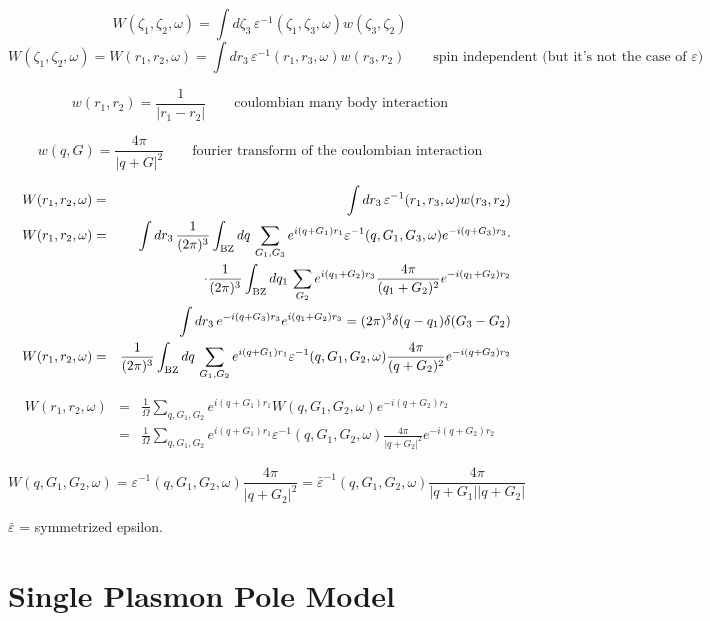 \documentclass[fleqn]{article}
\begin{document}
\[
W(\zeta_1,\zeta_2,\omega) = \int d\zeta_3 \, \varepsilon^{-1}(\zeta_1,\zeta_3,\omega) w(\zeta_3,\zeta_2)
\]
\[
W(\zeta_1,\zeta_2,\omega) =
W(r_1,r_2,\omega) = \int dr_3 \, \varepsilon^{-1}(r_1,r_3,\omega) w(r_3,r_2)
\qquad \textrm{spin independent (but it's not the case of $\varepsilon$)}
\]

\[
  w(r_1,r_2) = \frac{1}{|r_1-r_2|}
  \qquad \textrm{coulombian many body interaction}
\]

\[
  w(q,G) = \frac{4 \pi}{|q+G|^2}
  \qquad \textrm{fourier transform of the coulombian interaction}
\]

\begin{eqnarray*}
\quad
W(r_1,r_2,\omega) &=& \int dr_3 \, \varepsilon^{-1}(r_1,r_3,\omega) w(r_3,r_2) \\
W(r_1,r_2,\omega) 
  &=& \int dr_3 \, \frac{1}{(2\pi)^3} \int_{\rm BZ} dq \, \sum_{G_1,G_3} e^{i (q+G_1) r_1}
  \varepsilon^{-1}(q,G_1,G_3,\omega) e^{-i (q+G_3) r_3} \cdot \\ && \cdot
  \frac{1}{(2\pi)^3} \int_{\rm BZ} dq_1\, \sum_{G_2} e^{i (q_1+G_2) r_3}
  \frac{4\pi}{(q_1+G_2)^2} e^{-i (q_1+G_2) r_2} \\ &&
  \int dr_3 \, e^{-i (q+G_3) r_3} e^{i (q_1+G_2) r_3} = (2\pi)^3 \delta(q-q_1) \delta(G_3-G_2) \\
  W(r_1,r_2,\omega) 
  &=& \frac{1}{(2\pi)^3} \int_{\rm BZ} dq \, \sum_{G_1,G_2} e^{i (q+G_1) r_1}
  \varepsilon^{-1}(q,G_1,G_2,\omega)  \frac{4\pi}{(q+G_2)^2} e^{-i (q+G_2) r_2} 
\end{eqnarray*}

\begin{eqnarray*}
W(r_1,r_2,\omega) &=& \frac{1}{\Omega} \sum_{q,G_1,G_2} 
e^{i (q+G_1) r_1} W(q,G_1,G_2,\omega) e^{-i (q+G_2) r_2} \\
&=&  \frac{1}{\Omega} \sum_{q,G_1,G_2}
  e^{i (q+G_1) r_1} \varepsilon^{-1}(q,G_1,G_2,\omega) \frac{4\pi}{|q+G_2|^2} e^{-i (q+G_2) r_2} 
\end{eqnarray*}

\[
W(q,G_1,G_2,\omega) = 
\varepsilon^{-1}(q,G_1,G_2,\omega) \frac{4 \pi}{|q+G_2|^2}
= \bar{\varepsilon}^{-1}(q,G_1,G_2,\omega) \frac{4 \pi}{|q+G_1| |q+G_2|}
\]

$\bar{\varepsilon}$ = symmetrized epsilon.

\newpage


\section{Single Plasmon Pole Model}
\end{document}
